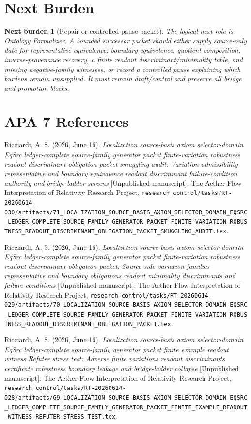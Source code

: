 \documentclass[11pt]{article}
\newtheorem{nextburden}{Next burden}
\begin{document}
\section{Next Burden}

\begin{nextburden}[Repair-or-controlled-pause packet]
The logical next role is Ontology Formalizer. A bounded successor
packet should either supply source-only data for representative
equivalence, boundary equivalence, quotient composition,
inverse-provenance recovery, a finite readout discriminant/minimality
table, and missing negative-family witnesses, or record a controlled
pause explaining which burdens remain unsupplied. It must remain
draft/control and preserve all bridge and promotion blocks.
\end{nextburden}

\section*{APA 7 References}

Ricciardi, A. S. (2026, June 16). \emph{Localization source-basis axiom
selector-domain EqSrc ledger-complete source-family generator packet
finite-variation robustness readout-discriminant obligation packet
smuggling audit: Variation-admissibility representative and boundary
equivalence readout discriminant failure-condition authority and
bridge-ladder screens} [Unpublished manuscript]. The Aether-Flow
Interpretation of Relativity Research Project,
\texttt{research\_control/tasks/RT-20260614-030/artifacts/71\_LOCALIZATION\_SOURCE\_BASIS\_AXIOM\_SELECTOR\_DOMAIN\_EQSRC\_LEDGER\_COMPLETE\_SOURCE\_FAMILY\_GENERATOR\_PACKET\_FINITE\_VARIATION\_ROBUSTNESS\_READOUT\_DISCRIMINANT\_OBLIGATION\_PACKET\_SMUGGLING\_AUDIT.tex}.

Ricciardi, A. S. (2026, June 16). \emph{Localization source-basis axiom
selector-domain EqSrc ledger-complete source-family generator packet
finite-variation robustness readout-discriminant obligation packet:
Source-side variation families representative and boundary obligations
readout minimality discriminants and failure conditions} [Unpublished
manuscript]. The Aether-Flow Interpretation of Relativity Research
Project,
\texttt{research\_control/tasks/RT-20260614-029/artifacts/70\_LOCALIZATION\_SOURCE\_BASIS\_AXIOM\_SELECTOR\_DOMAIN\_EQSRC\_LEDGER\_COMPLETE\_SOURCE\_FAMILY\_GENERATOR\_PACKET\_FINITE\_VARIATION\_ROBUSTNESS\_READOUT\_DISCRIMINANT\_OBLIGATION\_PACKET.tex}.

Ricciardi, A. S. (2026, June 16). \emph{Localization source-basis axiom
selector-domain EqSrc ledger-complete source-family generator packet
finite example readout witness Refuter stress test: Adverse finite
variations readout discriminants certificate robustness boundary
leakage and bridge-ladder collapse} [Unpublished manuscript]. The
Aether-Flow Interpretation of Relativity Research Project,
\texttt{research\_control/tasks/RT-20260614-028/artifacts/69\_LOCALIZATION\_SOURCE\_BASIS\_AXIOM\_SELECTOR\_DOMAIN\_EQSRC\_LEDGER\_COMPLETE\_SOURCE\_FAMILY\_GENERATOR\_PACKET\_FINITE\_EXAMPLE\_READOUT\_WITNESS\_REFUTER\_STRESS\_TEST.tex}.
\end{document}
